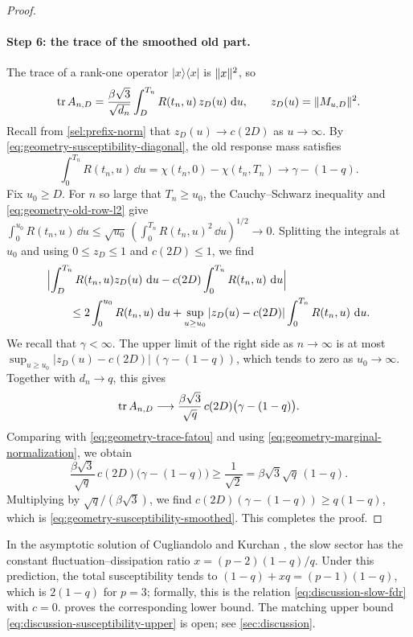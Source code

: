 \begin{proof}
\paragraph{Step 6: the trace of the smoothed old part.}
The trace of a rank-one operator $|x\rangle\langle x|$ is $\lVert x\rVert^2$, so
\[
 \operatorname{tr} A_{n,D}=\frac{\beta\sqrt3}{\sqrt{d_n}}\int_D^{T_n}R(t_n,u)\,z_D(u)\,\mathop{}\!\mathrm d u,
 \qquad z_D(u)=\lVert M_{u,D}\rVert^2 .
\]
Recall from \eqref{sel:prefix-norm} that $z_D(u)\to c(2D)$ as $u\to\infty$. By \eqref{eq:geometry-susceptibility-diagonal}, the old response mass satisfies
\[
 \int_0^{T_n}R(t_n,u)\,\dd u=\chi(t_n,0)-\chi(t_n,T_n)\longrightarrow\gamma-(1-q) .
\]
Fix $u_0\ge D$. For $n$ so large that $T_n\ge u_0$, the Cauchy--Schwarz inequality and \eqref{eq:geometry-old-row-l2} give $\int_0^{u_0}R(t_n,u)\,\dd u\le\sqrt{u_0}\,(\int_0^{T_n}R(t_n,u)^2\,\dd u)^{1/2}\to0$. Splitting the integrals at $u_0$ and using $0\le z_D\le1$ and $c(2D)\le1$, we find
\begin{align*}
 &\Bigl|\int_D^{T_n}R(t_n,u)z_D(u)\,\mathop{}\!\mathrm d u-c(2D)\int_0^{T_n}R(t_n,u)\,\mathop{}\!\mathrm d u\Bigr|\\
 &\qquad\le2\int_0^{u_0}R(t_n,u)\,\mathop{}\!\mathrm d u+\sup_{u\ge u_0}|z_D(u)-c(2D)|\int_0^{T_n}R(t_n,u)\,\mathop{}\!\mathrm d u .
\end{align*}
We recall that $\gamma<\infty$. The upper limit of the right side as $n\to\infty$ is at most $\sup_{u\ge u_0}|z_D(u)-c(2D)|\,(\gamma-(1-q))$, which tends to zero as $u_0\to\infty$. Together with $d_n\to q$, this gives
\[
 \operatorname{tr} A_{n,D}\longrightarrow\frac{\beta\sqrt3}{\sqrt q}\,c(2D)\bigl(\gamma-(1-q)\bigr).
\]
Comparing with \eqref{eq:geometry-trace-fatou} and using \eqref{eq:geometry-marginal-normalization}, we obtain
\[
 \frac{\beta\sqrt3}{\sqrt q}\,c(2D)\bigl(\gamma-(1-q)\bigr)\ge\frac1{\sqrt2}=\beta\sqrt3\sqrt q\,(1-q) .
\]
Multiplying by $\sqrt q/(\beta\sqrt3)$, we find $c(2D)(\gamma-(1-q))\ge q(1-q)$, which is \eqref{eq:geometry-susceptibility-smoothed}. This completes the proof.
\end{proof}

\begin{remark}\label{rem:geometry-susceptibility-prediction}
In the asymptotic solution of Cugliandolo and Kurchan \cite[arXiv version~1, paragraph after Equation~(12) and Equation~(13), p.~6]{ck1993}, the slow sector has the constant fluctuation--dissipation ratio $x=(p-2)(1-q)/q$. Under this prediction, the total susceptibility tends to $(1-q)+xq=(p-1)(1-q)$, which is $2(1-q)$ for $p=3$; formally, this is the relation \eqref{eq:discussion-slow-fdr} with $c=0$.  proves the corresponding lower bound. The matching upper bound \eqref{eq:discussion-susceptibility-upper} is open; see \cref{sec:discussion}.
\end{remark}
